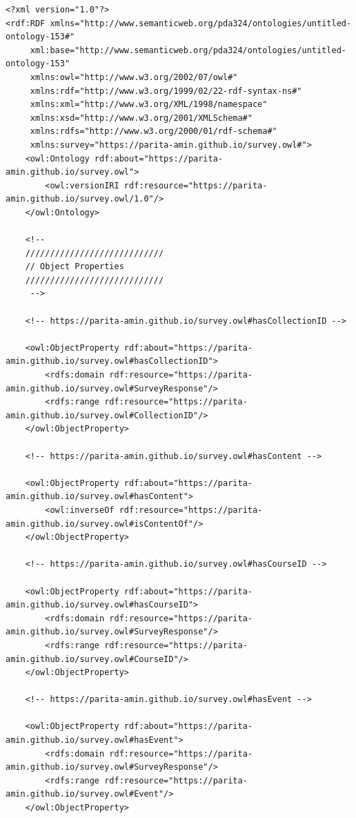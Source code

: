 \begin{lstlisting}
<?xml version="1.0"?>
<rdf:RDF xmlns="http://www.semanticweb.org/pda324/ontologies/untitled-ontology-153#"
     xml:base="http://www.semanticweb.org/pda324/ontologies/untitled-ontology-153"
     xmlns:owl="http://www.w3.org/2002/07/owl#"
     xmlns:rdf="http://www.w3.org/1999/02/22-rdf-syntax-ns#"
     xmlns:xml="http://www.w3.org/XML/1998/namespace"
     xmlns:xsd="http://www.w3.org/2001/XMLSchema#"
     xmlns:rdfs="http://www.w3.org/2000/01/rdf-schema#"
     xmlns:survey="https://parita-amin.github.io/survey.owl#">
    <owl:Ontology rdf:about="https://parita-amin.github.io/survey.owl">
        <owl:versionIRI rdf:resource="https://parita-amin.github.io/survey.owl/1.0"/>
    </owl:Ontology>
 
    <!-- 
    ////////////////////////////
    // Object Properties
    ////////////////////////////
     -->

    <!-- https://parita-amin.github.io/survey.owl#hasCollectionID -->

    <owl:ObjectProperty rdf:about="https://parita-amin.github.io/survey.owl#hasCollectionID">
        <rdfs:domain rdf:resource="https://parita-amin.github.io/survey.owl#SurveyResponse"/>
        <rdfs:range rdf:resource="https://parita-amin.github.io/survey.owl#CollectionID"/>
    </owl:ObjectProperty>
    
    <!-- https://parita-amin.github.io/survey.owl#hasContent -->

    <owl:ObjectProperty rdf:about="https://parita-amin.github.io/survey.owl#hasContent">
        <owl:inverseOf rdf:resource="https://parita-amin.github.io/survey.owl#isContentOf"/>
    </owl:ObjectProperty>
    
    <!-- https://parita-amin.github.io/survey.owl#hasCourseID -->

    <owl:ObjectProperty rdf:about="https://parita-amin.github.io/survey.owl#hasCourseID">
        <rdfs:domain rdf:resource="https://parita-amin.github.io/survey.owl#SurveyResponse"/>
        <rdfs:range rdf:resource="https://parita-amin.github.io/survey.owl#CourseID"/>
    </owl:ObjectProperty>
    
    <!-- https://parita-amin.github.io/survey.owl#hasEvent -->

    <owl:ObjectProperty rdf:about="https://parita-amin.github.io/survey.owl#hasEvent">
        <rdfs:domain rdf:resource="https://parita-amin.github.io/survey.owl#SurveyResponse"/>
        <rdfs:range rdf:resource="https://parita-amin.github.io/survey.owl#Event"/>
    </owl:ObjectProperty>
    

\end{lstlisting}

